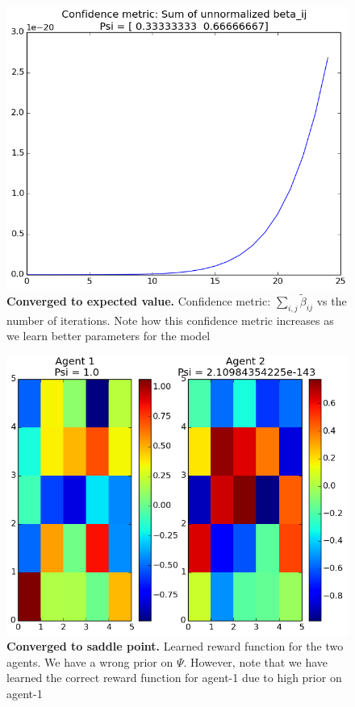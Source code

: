 \documentclass{article}[11pt]
\begin{document}
 \begin{figure}[H]
  \begin{center}
    \includegraphics[width=1\linewidth]{images/confidence6}
    \caption{\textbf{Converged to expected value.} Confidence metric: $\sum_{i,j} \tilde{\beta}_{ij}$ vs the number of iterations. Note how this confidence metric increases as we learn better parameters for the model}
    \label{h_c}
  \end{center}
\end{figure}


 \begin{figure}[H]
  \begin{center}
    \includegraphics[width=1\linewidth]{images/rewards0}
    \caption{ \textbf{Converged to saddle point.} Learned reward function for the two agents. We have a wrong prior on $\Psi$. However, note that we have learned the correct reward function for agent-1 due to high prior on agent-1}
    \label{fig:5grid}
  \end{center}
\end{figure}
\end{document}
